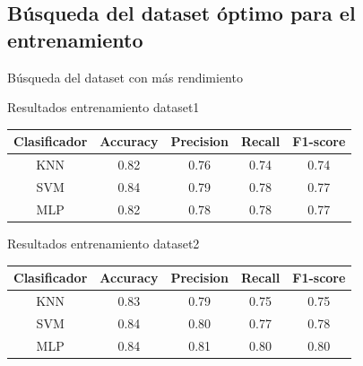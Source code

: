 \documentclass{beamer}
\begin{document}
\subsection{Búsqueda del dataset óptimo para el entrenamiento}
\begin{frame}{Búsqueda del dataset con más rendimiento}
\begin{block}{Resultados entrenamiento dataset1}
\begin{table}[H]
\begin{center}
\begin{tabular}{|c|c|c|c|c|}
     \hline
    \textbf{Clasificador} & \textbf{Accuracy} & \textbf{Precision} & \textbf{Recall} & \textbf{F1-score}\\
    \hline
     KNN & 0.82 & 0.76 & 0.74 & 0.74\\
     SVM & 0.84 & 0.79 & 0.78 & 0.77\\
     MLP & 0.82 & 0.78 & 0.78 & 0.77\\
     \hline
 \end{tabular}
\end{center}
\end{table}
\end{block}

\begin{block}{Resultados entrenamiento dataset2}
\begin{table}[H]
\begin{center}
\begin{tabular}{|c|c|c|c|c|}
     \hline
    \textbf{Clasificador} & \textbf{Accuracy} & \textbf{Precision} & \textbf{Recall} & \textbf{F1-score}\\
    \hline
     KNN & 0.83 & 0.79 & 0.75 & 0.75\\
     SVM & 0.84 & 0.80 & 0.77 & 0.78\\
     MLP & 0.84 & 0.81 & 0.80 & 0.80\\
     \hline
 \end{tabular}
\end{center}
\end{table}
\end{block}
\end{frame}
\end{document}
